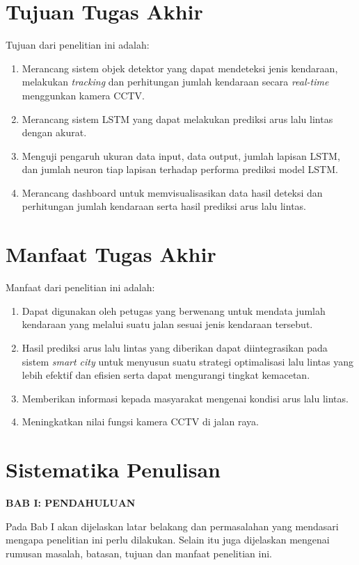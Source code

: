 \documentclass[../thesis.tex]{subfiles}
\begin{document}
\section{Tujuan Tugas Akhir}
Tujuan dari penelitian ini adalah:
\begin{enumerate}
    \item Merancang sistem objek detektor yang dapat mendeteksi jenis kendaraan, melakukan \textit{tracking} dan perhitungan jumlah kendaraan secara \textit{real-time} menggunkan kamera CCTV.
    \item Merancang sistem LSTM yang dapat melakukan prediksi arus lalu lintas dengan akurat.
    \item Menguji pengaruh ukuran data input, data output, jumlah lapisan LSTM, dan jumlah neuron tiap lapisan terhadap performa prediksi model LSTM.
    \item Merancang dashboard untuk memvisualisasikan data hasil deteksi dan perhitungan jumlah kendaraan serta hasil prediksi arus lalu lintas.
\end{enumerate}

\section{Manfaat Tugas Akhir}
Manfaat dari penelitian ini adalah:
\begin{enumerate}
\item Dapat digunakan oleh petugas yang berwenang untuk mendata jumlah kendaraan yang melalui suatu jalan sesuai jenis kendaraan tersebut.
\item Hasil prediksi arus lalu lintas yang diberikan dapat diintegrasikan pada sistem \textit{smart city} untuk menyusun suatu strategi optimalisasi lalu lintas yang lebih efektif dan efisien serta dapat mengurangi tingkat kemacetan.
\item Memberikan informasi kepada masyarakat mengenai kondisi arus lalu lintas.
\item Meningkatkan nilai fungsi kamera CCTV di jalan raya.
\end{enumerate}

\section{Sistematika Penulisan}
\begin{flushleft}
    \textbf{BAB I: PENDAHULUAN} 
\end{flushleft}
\par
Pada Bab I akan dijelaskan latar belakang dan permasalahan yang mendasari mengapa
penelitian ini perlu dilakukan. Selain itu juga dijelaskan mengenai rumusan masalah, batasan,
tujuan dan manfaat penelitian ini.
\end{document}
